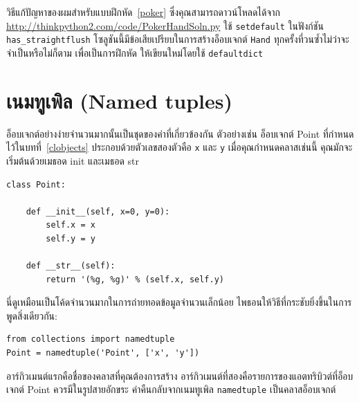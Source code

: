 วิธีแก้ปัญหาของผมสำหรับแบบฝึกหัด~\ref{poker} ซึ่งคุณสามารถดาวน์โหลดได้จาก \url{http://thinkpython2.com/code/PokerHandSoln.py} 
ใช้ {\tt setdefault} ในฟังก์ชัน \verb"has_straightflush" โซลูชันนี้มีข้อเสียเปรียบในการสร้างอ็อบเจกต์ {\tt Hand} 
ทุกครั้งที่วนซ้ำไม่ว่าจะจำเป็นหรือไม่ก็ตาม เพื่อเป็นการฝึกหัด ให้เขียนใหม่โดยใช้ \texttt{defaultdict}


\section[เนมทูเพิล]{เนมทูเพิล (Named tuples)} %


อ็อบเจกต์อย่างง่ายจำนวนมากนั้นเป็นชุดของค่าที่เกี่ยวข้องกัน ตัวอย่างเช่น อ็อบเจกต์ Point 
ที่กำหนดไว้ในบทที่~\ref{clobjects} ประกอบด้วยตัวเลขสองตัวคือ {\tt x} และ {\tt y} เมื่อคุณกำหนดคลาสเช่นนี้ คุณมักจะเริ่มต้นด้วยเมธอด init และเมธอด str


\begin{verbatim}
class Point:

    def __init__(self, x=0, y=0):
        self.x = x
        self.y = y

    def __str__(self):
        return '(%g, %g)' % (self.x, self.y)
\end{verbatim}

นี่ดูเหมือนเป็นโค้ดจำนวนมากในการถ่ายทอดข้อมูลจำนวนเล็กน้อย ไพธอนให้วิธีที่กระชับยิ่งขึ้นในการพูดสิ่งเดียวกัน:

\begin{verbatim}
from collections import namedtuple
Point = namedtuple('Point', ['x', 'y'])
\end{verbatim}

อาร์กิวเมนต์แรกคือชื่อของคลาสที่คุณต้องการสร้าง อาร์กิวเมนต์ที่สองคือรายการของแอตทริบิวต์ที่อ็อบเจกต์ Point ควรมีในรูปสายอักขระ ค่าคืนกลับจากเนมทูเพิล {\tt namedtuple} เป็นคลาสอ็อบเจกต์

